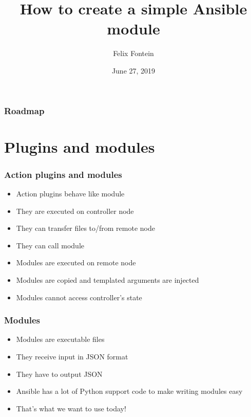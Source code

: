 \documentclass{beamer}
\title{How to create a simple Ansible module}
\author{Felix Fontein}
\date{June 27, 2019}
\begin{document}
  \frame{\titlepage}

  \begin{frame}
    \frametitle{Roadmap}
    \tableofcontents%
  \end{frame}

  \section{Plugins and modules}
  \begin{frame}
    \frametitle{Action plugins and modules}
    \begin{itemize}
      \item \alert{Action plugins} behave like module
      \item They are executed on controller node
      \item They can transfer files to/from remote node
      \item They can call module

      \vspace{0.5cm}

      \item<2-> \alert{Modules} are executed on remote node
      \item<2-> Modules are copied and templated arguments are injected
      \item<2-> Modules cannot access controller's state
    \end{itemize}
  \end{frame}

  \begin{frame}
    \frametitle{Modules}
    \begin{itemize}
      \item Modules are executable files
      \item They receive input in JSON format
      \item They have to output JSON

      \vspace{0.5cm}

      \item<2-> Ansible has a lot of Python support code to make writing modules easy

      \vspace{0.5cm}

      \item<3-> That's what we want to use today!
    \end{itemize}
  \end{frame}
\end{document}
